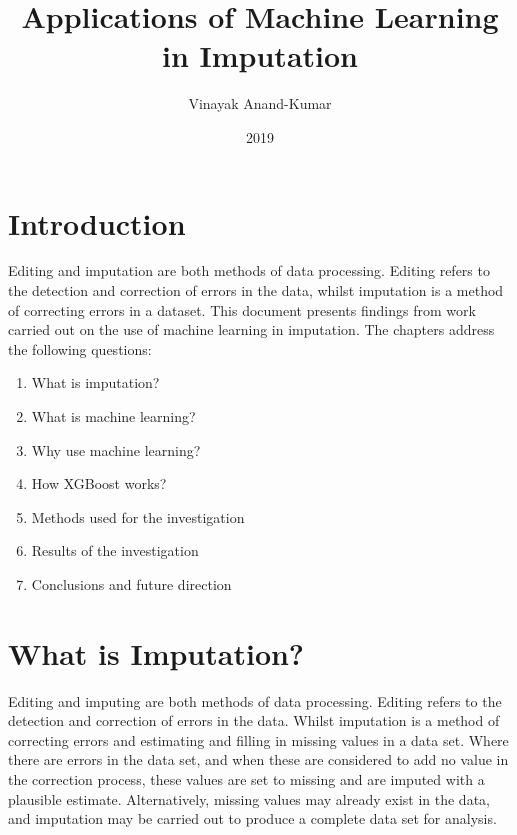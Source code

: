 \documentclass[]{book}
\title{Applications of Machine Learning in Imputation}
\author{Vinayak Anand-Kumar}
\date{2019}
\providecommand{\tightlist}{%
  \setlength{\itemsep}{0pt}\setlength{\parskip}{0pt}}
\begin{document}
\maketitle

{
\setcounter{tocdepth}{1}
\tableofcontents
}
\chapter{Introduction}\label{introduction}

Editing and imputation are both methods of data processing. Editing
refers to the detection and correction of errors in the data, whilst
imputation is a method of correcting errors in a dataset. This document
presents findings from work carried out on the use of machine learning
in imputation. The chapters address the following questions:

\begin{enumerate}
\def\labelenumi{\arabic{enumi})}
\tightlist
\item
  What is imputation?\\
\item
  What is machine learning?\\
\item
  Why use machine learning?\\
\item
  How XGBoost works?\\
\item
  Methods used for the investigation\\
\item
  Results of the investigation\\
\item
  Conclusions and future direction
\end{enumerate}

\chapter{What is Imputation?}\label{what-is-imputation}

Editing and imputing are both methods of data processing. Editing refers
to the detection and correction of errors in the data. Whilst imputation
is a method of correcting errors and estimating and filling in missing
values in a data set. Where there are errors in the data set, and when
these are considered to add no value in the correction process, these
values are set to missing and are imputed with a plausible estimate.
Alternatively, missing values may already exist in the data, and
imputation may be carried out to produce a complete data set for
analysis.
\end{document}
